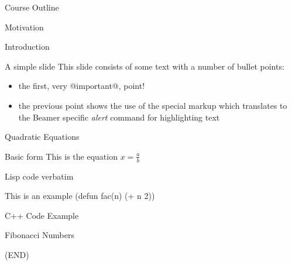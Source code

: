\documentclass[bigger]{beamer}
\begin{document}
\begin{frame}[label=sec-4]{Course Outline}
\begin{block}{Motivation}
\end{block}
\end{frame}


\begin{frame}[label=sec-5]{Introduction}
\begin{block}{A simple slide}
This slide consists of some text with a number of bullet points:

\begin{itemize}
\item the first, very @important@, point!
\item the previous point shows the use of the special markup which
translates to the Beamer specific \emph{alert} command for highlighting
text
\end{itemize}
\end{block}
\end{frame}
\begin{frame}[label=sec-6]{Quadratic Equations}
\begin{block}{Basic form}
This is the equation $x=\frac{a}{b}$
\end{block}
\end{frame}

\begin{frame}[label=sec-7]{Lisp code verbatim}
\begin{example}
This is an example
(defun fac(n) (+ n 2))
\end{example}
\end{frame}

\begin{frame}[label=sec-8]{C++ Code Example}
\begin{block}{Fibonacci Numbers}

(END) 
\end{block}
\end{frame}
\end{document}
